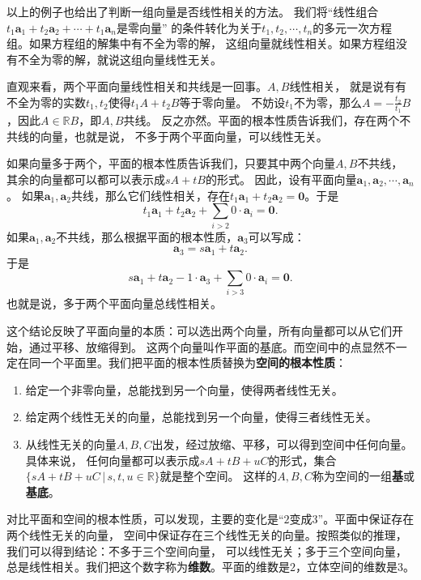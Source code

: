 \documentclass[12pt,UTF8]{ctexbook}
\begin{document}
以上的例子也给出了判断一组向量是否线性相关的方法。
我们将“线性组合$t_1\mathbf{a}_1 + t_2\mathbf{a}_2 + \cdots + t_1\mathbf{a}_n$是零向量”
的条件转化为关于$t_1, t_2, \cdots , t_n$的多元一次方程组。如果方程组的解集中有不全为零的解，
这组向量就线性相关。如果方程组没有不全为零的解，就说这组向量线性无关。

直观来看，两个平面向量线性相关和共线是一回事。$A, B$线性相关，
就是说有有不全为零的实数$t_1,t_2$使得$t_1A + t_2B$等于零向量。
不妨设$t_1$不为零，那么$A = -\frac{t_2}{t_1}B$，因此$A\in\mathbb{R}B$，即$A, B$共线。
反之亦然。平面的根本性质告诉我们，存在两个不共线的向量，也就是说，
不多于两个平面向量，可以线性无关。

如果向量多于两个，平面的根本性质告诉我们，只要其中两个向量$A, B$不共线，
其余的向量都可以都可以表示成$sA + tB$的形式。
因此，设有平面向量$\mathbf{a}_1, \mathbf{a}_2, \cdots , \mathbf{a}_n$。
如果$\mathbf{a}_1, \mathbf{a}_2$共线，那么它们线性相关，存在$t_1\mathbf{a}_1 + t_2\mathbf{a}_2 = \mathbf{0}$。于是
$$t_1\mathbf{a}_1 + t_2\mathbf{a}_2 + \sum_{i>2}0\cdot\mathbf{a}_i = \mathbf{0}.$$
如果$\mathbf{a}_1, \mathbf{a}_2$不共线，那么根据平面的根本性质，$\mathbf{a}_3$可以写成：
$$ \mathbf{a}_3 = s\mathbf{a}_1 + t\mathbf{a}_2.$$
于是
$$s\mathbf{a}_1 + t\mathbf{a}_2 - 1\cdot\mathbf{a}_3 + \sum_{i>3}0\cdot\mathbf{a}_i = \mathbf{0}.$$
也就是说，多于两个平面向量总线性相关。

这个结论反映了平面向量的本质：可以选出两个向量，所有向量都可以从它们开始，通过平移、放缩得到。
这两个向量叫作平面的基底。而空间中的点显然不一定在同一个平面里。我们把平面的根本性质替换为\textbf{空间的根本性质}：

\begin{enumerate}
    \item 给定一个非零向量，总能找到另一个向量，使得两者线性无关。
    \item 给定两个线性无关的向量，总能找到另一个向量，使得三者线性无关。
    \item 从线性无关的向量$A, B, C$出发，经过放缩、平移，可以得到空间中任何向量。具体来说，
    任何向量都可以表示成$sA + tB + uC$的形式，集合$\{sA + tB + uC \, | \, s, t, u \in\mathbb{R}\}$就是整个空间。
    这样的$A, B, C$称为空间的一组\textbf{基}或\textbf{基底}。
\end{enumerate}

对比平面和空间的根本性质，可以发现，主要的变化是“$2$变成$3$”。平面中保证存在两个线性无关的向量，
空间中保证存在三个线性无关的向量。按照类似的推理，我们可以得到结论：不多于三个空间向量，
可以线性无关；多于三个空间向量，总是线性相关。我们把这个数字称为\textbf{维数}。平面的维数是$2$，立体空间的维数是$3$。
\end{document}
